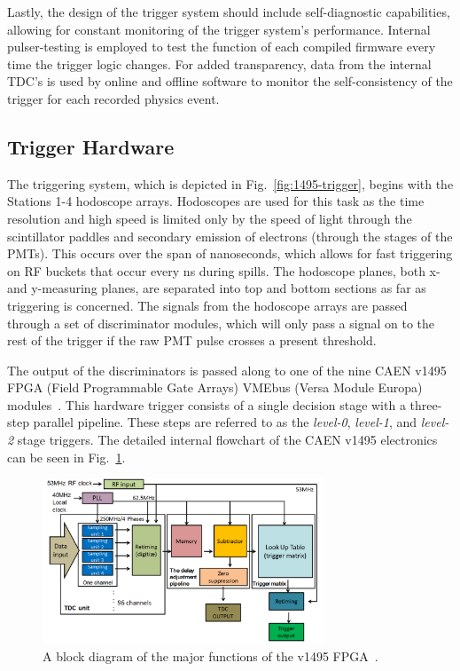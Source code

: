 Lastly, the design of the trigger system should include self-diagnostic capabilities, allowing for constant monitoring of the trigger system's performance. Internal pulser-testing is employed to test the function of each compiled firmware every time the trigger logic changes. For added transparency, data from the internal TDC's is used by online and offline software to monitor the self-consistency of the trigger for each recorded physics event.

\subsection{Trigger Hardware}

The triggering system, which is depicted in Fig.~\ref{fig:1495-trigger}, begins with the Stations 1-4 hodoscope arrays. Hodoscopes are used for this task as the time resolution and high speed is limited only by the speed of light through the scintillator paddles and secondary emission of electrons (through the stages of the PMTs). This occurs over the span of nanoseconds, which allows for fast triggering on RF buckets that occur every \unit[19]{ns} during spills. The hodoscope planes, both x- and y-measuring planes, are separated into top and bottom sections as far as triggering is concerned. The signals from the hodoscope arrays are passed through a set of discriminator modules, which will only pass a signal on to the rest of the trigger if the raw PMT pulse crosses a present threshold.

The output of the discriminators is passed along to one of the nine CAEN v1495 FPGA (Field Programmable Gate Arrays) VMEbus (Versa Module Europa) modules~\cite{caen:v1495}. This hardware trigger consists of a single decision stage with a three-step parallel pipeline. These steps are referred to as the \emph{level-0}, \emph{level-1}, and \emph{level-2} stage triggers. The detailed internal flowchart of the CAEN v1495 electronics can be seen in Fig.~\ref{fig:v1495-internal}.

\begin{figure}
	\centering
	\includegraphics[width=0.75\textwidth]{figures/apparatus/trigger-block-diagram.png}
	\caption{A block diagram of the major functions of the v1495 FPGA~\cite{Shiu:2015ura}.}
	\label{fig:v1495-internal}
\end{figure}

